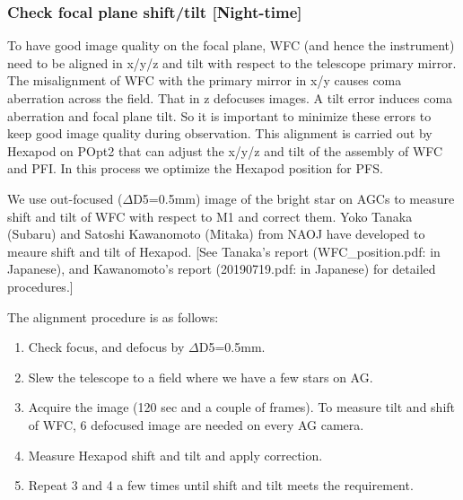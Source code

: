 \subsubsection{Check focal plane shift/tilt [Night-time]}\label{secflow:WFCTiltShift}

To have good image quality on the focal plane, WFC (and hence the instrument) need to be aligned in x/y/z and tilt with respect to the telescope primary mirror.
The misalignment of WFC with the primary mirror in x/y causes coma aberration across the field.
That in z defocuses images.
A tilt error induces coma aberration and focal plane tilt.
So it is important to minimize these errors to keep good image quality during observation. 
This alignment is carried out by Hexapod on POpt2 that can adjust the x/y/z and tilt of the assembly of WFC and PFI.
In this process we optimize the Hexapod position for PFS.

We use out-focused ($\Delta$D5=0.5mm) image of the bright star on AGCs to measure shift and tilt of WFC with respect to M1 and correct them.
Yoko Tanaka (Subaru) and Satoshi Kawanomoto (Mitaka) from NAOJ have developed to meaure shift and tilt of Hexapod.
[See Tanaka's report (WFC\_position.pdf: in Japanese), and Kawanomoto's report (20190719.pdf: in Japanese) for detailed procedures.]


The alignment procedure is as follows:
\begin{enumerate}
\item Check focus, and defocus by $\Delta$D5=0.5mm.
\item Slew the telescope to a field where we have a few stars on AG.
\item Acquire the image (120 sec and a couple of frames).
To measure tilt and shift of WFC, 6 defocused image are needed on every AG camera.
\item Measure Hexapod shift and tilt and apply correction.
\item Repeat 3 and 4 a few times until shift and tilt meets the requirement.
\end{enumerate}

